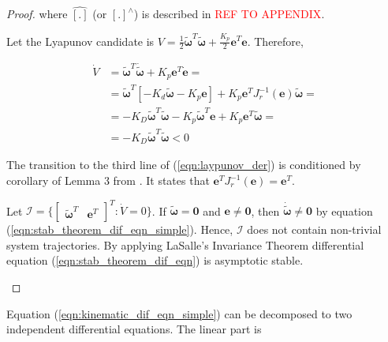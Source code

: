 \begin{proof}
    where $\hat{[.]}$ (or $[.]^{\wedge}$) is described in 
    \textcolor{red}{REF TO APPENDIX}.

    Let the Lyapunov candidate is $V = \frac{1}{2} 
    \tilde{\boldsymbol{\omega}}^T \tilde{\boldsymbol{\omega}} + 
    \frac{K_p}{2} \mathbf{e}^T \mathbf{e}
    $. Therefore, 

    \begin{equation}
        \begin{aligned}
            \dot{V} & = 
            \tilde{\boldsymbol{\omega}}^T \dot{\tilde{\boldsymbol{\omega}}}
            + K_p 
            \mathbf{e}^T \dot{\mathbf{e}} = \\
            & = \tilde{\boldsymbol{\omega}}^T [
                -K_d \tilde{\boldsymbol{\omega}} - K_p \mathbf{e}
            ] + K_p \mathbf{e}^T J_r^{-1}(\mathbf{e}) \tilde{\boldsymbol{\omega}} =\\
            & = -K_D \tilde{\boldsymbol{\omega}}^T \tilde{\boldsymbol{\omega}} 
            - K_p \tilde{\boldsymbol{\omega}}^T \mathbf{e} 
            + K_p \mathbf{e}^T \tilde{\boldsymbol{\omega}} = \\
            & = -K_D \tilde{\boldsymbol{\omega}}^T \tilde{\boldsymbol{\omega}} 
            < 0 
        \end{aligned}
        \label{eqn:laypunov_der}
    \end{equation}

    The transition to the third line of (\ref{eqn:laypunov_der}) is conditioned 
    by corollary of Lemma 3 from \cite{ANonlinearObserverUsingPose}. It states that 
    $\mathbf{e}^T J_r^{-1}(\mathbf{e}) = \mathbf{e}^T$.

    Let $\mathcal{I} = \{ \begin{bmatrix} \tilde{\boldsymbol{\omega}}^T & 
    \mathbf{e}^T \end{bmatrix}^T : \dot{V} = 0 \}$. If $\tilde{\boldsymbol{\omega}} 
    = \mathbf{0}$ and $\mathbf{e} \neq \mathbf{0}$, then 
    $\dot{\tilde{\boldsymbol{\omega}}} \neq \mathbf{0}$ by equation 
    (\ref{eqn:stab_theorem_dif_eqn_simple}). Hence, $\mathcal{I}$ does not contain 
    non-trivial system trajectories. By applying LaSalle's Invariance Theorem 
    differential equation (\ref{eqn:stab_theorem_dif_eqn}) is asymptotic stable.

    \label{pr:stability_theorem_proof}
\end{proof}

Equation (\ref{eqn:kinematic_dif_eqn_simple}) can be decomposed to two independent 
differential equations. The linear part is

